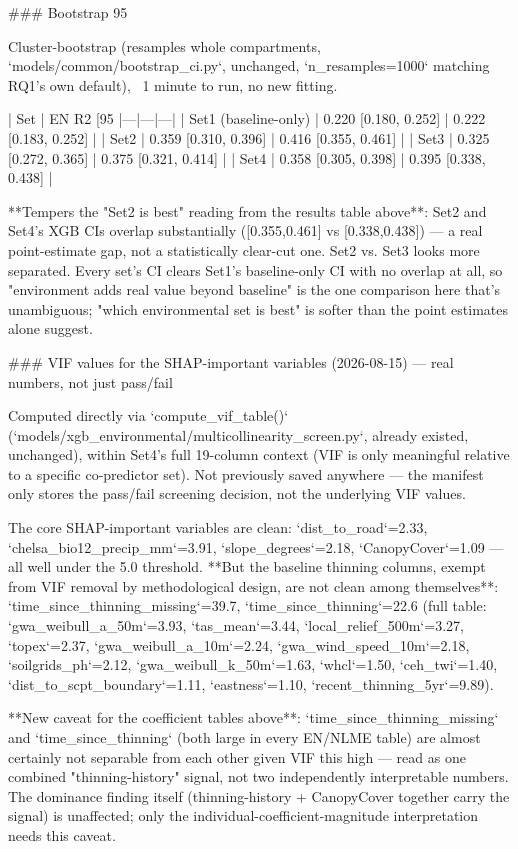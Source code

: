 ### Bootstrap 95%

Cluster-bootstrap (resamples whole compartments, `models/common/bootstrap_ci.py`, unchanged,
`n_resamples=1000` matching RQ1's own default), ~1 minute to run, no new fitting.

| Set | EN R2 [95%
|---|---|---|
| Set1 (baseline-only) | 0.220 [0.180, 0.252] | 0.222 [0.183, 0.252] |
| Set2 | 0.359 [0.310, 0.396] | 0.416 [0.355, 0.461] |
| Set3 | 0.325 [0.272, 0.365] | 0.375 [0.321, 0.414] |
| Set4 | 0.358 [0.305, 0.398] | 0.395 [0.338, 0.438] |

**Tempers the "Set2 is best" reading from the results table above**: Set2 and Set4's XGB CIs
overlap substantially ([0.355,0.461] vs [0.338,0.438]) — a real point-estimate gap, not a
statistically clear-cut one. Set2 vs. Set3 looks more separated. Every set's CI clears Set1's
baseline-only CI with no overlap at all, so "environment adds real value beyond baseline" is the
one comparison here that's unambiguous; "which environmental set is best" is softer than the point
estimates alone suggest.

### VIF values for the SHAP-important variables (2026-08-15) — real numbers, not just pass/fail

Computed directly via `compute_vif_table()` (`models/xgb_environmental/multicollinearity_screen.py`,
already existed, unchanged), within Set4's full 19-column context (VIF is only meaningful relative
to a specific co-predictor set). Not previously saved anywhere — the manifest only stores the
pass/fail screening decision, not the underlying VIF values.

The core SHAP-important variables are clean: `dist_to_road`=2.33, `chelsa_bio12_precip_mm`=3.91,
`slope_degrees`=2.18, `CanopyCover`=1.09 — all well under the 5.0 threshold. **But the baseline
thinning columns, exempt from VIF removal by methodological design, are not clean among
themselves**: `time_since_thinning_missing`=39.7, `time_since_thinning`=22.6 (full table:
`gwa_weibull_a_50m`=3.93, `tas_mean`=3.44, `local_relief_500m`=3.27, `topex`=2.37,
`gwa_weibull_a_10m`=2.24, `gwa_wind_speed_10m`=2.18, `soilgrids_ph`=2.12, `gwa_weibull_k_50m`=1.63,
`whcl`=1.50, `ceh_twi`=1.40, `dist_to_scpt_boundary`=1.11, `eastness`=1.10,
`recent_thinning_5yr`=9.89).

**New caveat for the coefficient tables above**: `time_since_thinning_missing` and
`time_since_thinning` (both large in every EN/NLME table) are almost certainly not separable from
each other given VIF this high — read as one combined "thinning-history" signal, not two
independently interpretable numbers. The dominance finding itself (thinning-history + CanopyCover
together carry the signal) is unaffected; only the individual-coefficient-magnitude interpretation
needs this caveat.

